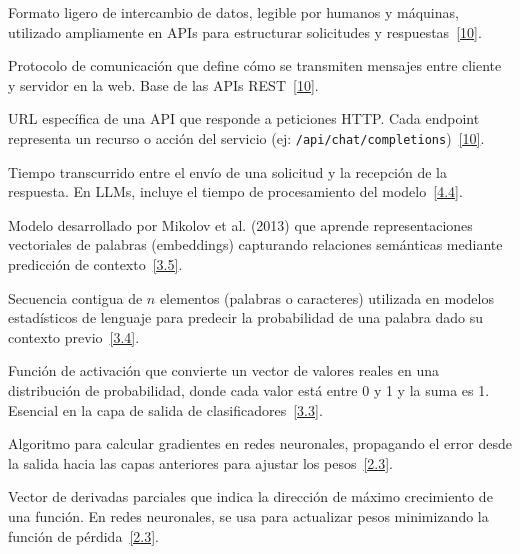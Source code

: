\documentclass[12pt,a4paper]{report}
\numberwithin{figure}{section}
\begin{document}
\begin{description}[style=nextline, leftmargin=1.5cm, labelwidth=1.3cm]
\item[\textbf{JSON (\textit{JavaScript Object Notation}):}] \label{glos:json} Formato ligero de intercambio de datos, legible por humanos y máquinas, utilizado ampliamente en APIs para estructurar solicitudes y respuestas~\hyperref[ref:10]{[10]}.

\item[\textbf{HTTP (\textit{HyperText Transfer Protocol}):}] \label{glos:http} Protocolo de comunicación que define cómo se transmiten mensajes entre cliente y servidor en la web. Base de las APIs REST~\hyperref[ref:10]{[10]}.

\item[\textbf{Endpoint:}] \label{glos:endpoint} URL específica de una API que responde a peticiones HTTP. Cada endpoint representa un recurso o acción del servicio (ej: \texttt{/api/chat/completions})~\hyperref[ref:10]{[10]}.

\item[\textbf{Latencia:}] \label{glos:latencia} Tiempo transcurrido entre el envío de una solicitud y la recepción de la respuesta. En LLMs, incluye el tiempo de procesamiento del modelo~\hyperref[ref:4]{[4.4]}.

\item[\textbf{Word2Vec:}] \label{glos:word2vec} Modelo desarrollado por Mikolov et al. (2013) que aprende representaciones vectoriales de palabras (embeddings) capturando relaciones semánticas mediante predicción de contexto~\hyperref[ref:3]{[3.5]}.

\item[\textbf{N-grama:}] \label{glos:ngram} Secuencia contigua de $n$ elementos (palabras o caracteres) utilizada en modelos estadísticos de lenguaje para predecir la probabilidad de una palabra dado su contexto previo~\hyperref[ref:3]{[3.4]}.

\item[\textbf{Softmax:}] \label{glos:softmax} Función de activación que convierte un vector de valores reales en una distribución de probabilidad, donde cada valor está entre 0 y 1 y la suma es 1. Esencial en la capa de salida de clasificadores~\hyperref[ref:3]{[3.3]}.

\item[\textbf{Backpropagation (Retropropagación):}] \label{glos:backprop} Algoritmo para calcular gradientes en redes neuronales, propagando el error desde la salida hacia las capas anteriores para ajustar los pesos~\hyperref[ref:2]{[2.3]}.

\item[\textbf{Gradiente:}] \label{glos:gradiente} Vector de derivadas parciales que indica la dirección de máximo crecimiento de una función. En redes neuronales, se usa para actualizar pesos minimizando la función de pérdida~\hyperref[ref:2]{[2.3]}.


\end{description}
\end{document}
